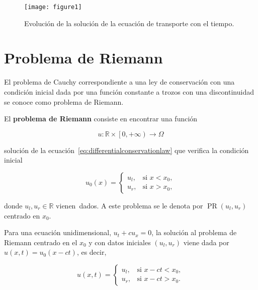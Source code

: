 \begin{figure}[ht!]
  \centering
  \texttt{[image: figure1]}
  \caption{
    Evolución de la solución de la ecuación de transporte con el
    tiempo.
  }
  \label{fig:1}
\end{figure}

\section{Problema de Riemann}

El problema de Cauchy correspondiente a una ley de conservación con
una condición inicial dada por una función constante a trozos con una
discontinuidad se conoce como problema de Riemann.

\begin{definition}
  El \textbf{problema de Riemann} consiste en encontrar una función

  \begin{equation*}
    u\colon\mathbb{R}\times
    \left[0,+\infty\right)\longrightarrow
    \Omega
  \end{equation*}

  solución de la ecuación~\eqref{eq:differentialconservationlaw} que
  verifica la condición inicial

  \begin{equation}\label{eq:initialconditionriemann}
    u_{0}\left(x\right)=
    \begin{cases}
      u_{l}, &
      \text{si } x<x_{0}, \\
      u_{r}, &
      \text{si } x>x_{0},
    \end{cases}
  \end{equation}

  donde $u_{l},u_{r}\in\mathbb{R}$ vienen~dados.
  A este problema se le denota por
  $\operatorname{PR}\left(u_{l},u_{r}\right)$ centrado en $x_{0}$.
\end{definition}

Para una ecuación unidimensional, $u_{t}+cu_{x}=0$, la solución al
problema de Riemann centrado en el $x_{0}$ y con datos iniciales
$\left(u_{l},u_{r}\right)$ viene dada por
$u\left(x,t\right)=u_{0}\left(x-ct\right)$, es decir,

\begin{equation}\label{eq:solutionriemann}
  u
  \left(x,t\right)=
  \begin{cases}
    u_{l}, &
    \text{si } x-ct<x_{0}, \\
    u_{r}, &
    \text{si } x-ct>x_{0}.
  \end{cases}
\end{equation}
